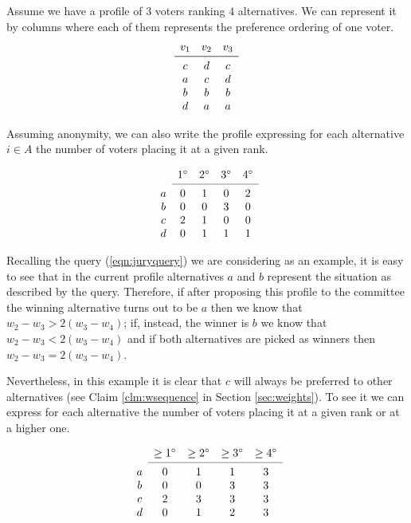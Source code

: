 \documentclass[12pt]{article}
\begin{document}
Assume we have a profile of $3$ voters ranking $4$ alternatives. We can represent it by columns where each of them represents the preference ordering of one voter.
\[
\begin{array}{ccc}
v_1
& v_2
& v_3 \\
\midrule 
c
& d
& c \\
a
& c
& d \\
b
& b
& b \\
d
& a
& a \\
\end{array}
\]

Assuming anonymity, we can also write the profile expressing for each alternative $i \in A$ the number of voters placing it at a given rank.

\[
\begin{array}{ccccc}
& 1^\circ
& 2^\circ
& 3^\circ
& 4^\circ \\
\cmidrule{2-5}
a 
& 0
& 1
& 0
& 2 \\
b
& 0
& 0
& 3
& 0 \\
c
& 2
& 1
& 0
& 0 \\
d
& 0
& 1
& 1
& 1 \\
\end{array}
\]

Recalling the query (\ref{eqn:juryquery}) we are considering as an example, it is easy to see that in the current profile alternatives $a$ and $b$ represent the situation as described by the query. Therefore, if after proposing this profile to the committee the winning alternative turns out to be $a$ then we know that $w_{2} - w_{3} > 2(w_{3} - w_{4})$; if, instead, the winner is $b$ we know that $w_{2} - w_{3} < 2(w_{3} - w_{4})$ and if both alternatives are picked as winners then $w_{2} - w_{3} = 2(w_{3} - w_{4})$. 

Nevertheless, in this example it is clear that $c$ will always be preferred to other alternatives (see Claim \ref{clm:wsequence} in Section \ref{sec:weights}). To see it we can express for each alternative the number of voters placing it at a given rank or at a higher one.

\[
\begin{array}{ccccc}
& \geq 1^\circ
& \geq 2^\circ
& \geq 3^\circ
& \geq 4^\circ \\
\cmidrule{2-5}
a 
& 0
& 1
& 1
& 3 \\
b
& 0
& 0
& 3
& 3 \\
c
& 2
& 3
& 3
& 3 \\
d
& 0
& 1
& 2
& 3 \\
\end{array}
\]
\end{document}
